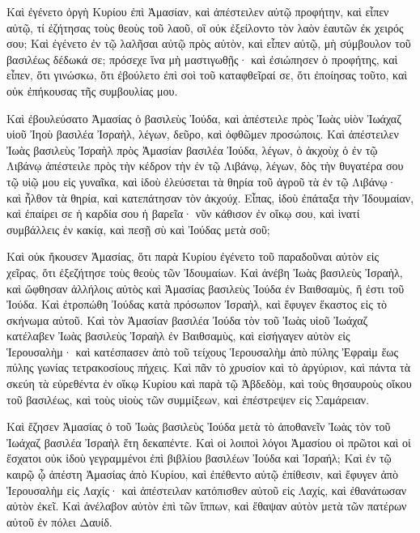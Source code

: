 {Καὶ ἐγένετο ὀργὴ Κυρίου ἐπὶ Ἀμασίαν, καὶ ἀπέστειλεν αὐτῷ προφήτην, καὶ εἶπεν αὐτῷ, τί ἐζήτησας τοὺς θεοὺς τοῦ λαοῦ, οἳ οὐκ ἐξείλοντο τὸν λαὸν ἑαυτῶν ἐκ χειρός σου;
Καὶ ἐγένετο ἐν τῷ λαλῆσαι αὐτῷ πρὸς αὐτὸν, καὶ εἶπεν αὐτῷ, μὴ σύμβουλον τοῦ βασιλέως δέδωκά σε; πρόσεχε ἵνα μὴ μαστιγωθῇς· καὶ ἐσιώπησεν ὁ προφήτης, καὶ εἶπεν, ὅτι γινώσκω, ὅτι ἐβούλετο ἐπὶ σοὶ τοῦ καταφθεῖραί σε, ὅτι ἐποίησας τοῦτο, καὶ οὐκ ἐπήκουσας τῆς συμβουλίας μου.
\par }{\PP {}Καὶ ἐβουλεύσατο Ἀμασίας ὁ βασιλεὺς Ἰούδα, καὶ ἀπέστειλε πρὸς Ἰωὰς υἱὸν Ἰωάχαζ υἱοῦ Ἰηοὺ βασιλέα Ἰσραὴλ, λέγων, δεῦρο, καὶ ὀφθῶμεν προσώποις.
Καὶ ἀπέστειλεν Ἰωὰς βασιλεὺς Ἰσραὴλ πρὸς Ἀμασίαν βασιλέα Ἰούδα, λέγων, ὁ ἀκχοὺχ ὁ ἐν τῷ Λιβάνῳ ἀπέστειλε πρὸς τὴν κέδρον τὴν ἐν τῷ Λιβάνῳ, λέγων, δὸς τὴν θυγατέρα σου τῷ υἱῷ μου εἰς γυναῖκα, καὶ ἰδοὺ ἐλεύσεται τὰ θηρία τοῦ ἀγροῦ τὰ ἐν τῷ Λιβάνῳ· καὶ ἦλθον τὰ θηρία, καὶ κατεπάτησαν τὸν ἀκχούχ.
Εἶπας, ἰδοὺ ἐπάταξα τὴν Ἰδουμαίαν, καὶ ἐπαίρει σε ἡ καρδία σου ἡ βαρεῖα· νῦν κάθισον ἐν οἴκῳ σου, καὶ ἱνατί συμβάλλεις ἐν κακίᾳ, καὶ πεσῇ σὺ καὶ Ἰούδας μετὰ σοῦ;
\par }{\PP {}Καὶ οὐκ ἤκουσεν Ἀμασίας, ὅτι παρὰ Κυρίου ἐγένετο τοῦ παραδοῦναι αὐτὸν εἰς χεῖρας, ὅτι ἐξεζήτησε τοὺς θεοὺς τῶν Ἰδουμαίων.
Καὶ ἀνέβη Ἰωὰς βασιλεὺς Ἰσραὴλ, καὶ ὤφθησαν ἀλλήλοις αὐτὸς καὶ Ἀμασίας βασιλεὺς Ἰούδα ἐν Βαιθσαμὺς, ἥ ἐστι τοῦ Ἰούδα.
Καὶ ἐτροπώθη Ἰούδας κατὰ πρόσωπον Ἰσραὴλ, καὶ ἔφυγεν ἕκαστος εἰς τὸ σκήνωμα αὐτοῦ.
Καὶ τὸν Ἀμασίαν βασιλέα Ἰούδα τὸν τοῦ Ἰωὰς υἱοῦ Ἰωάχαζ κατέλαβεν Ἰωὰς βασιλεὺς Ἰσραὴλ ἐν Βαιθσαμὺς, καὶ εἰσήγαγεν αὐτὸν εἰς Ἱερουσαλὴμ· καὶ κατέσπασεν ἀπὸ τοῦ τείχους Ἱερουσαλὴμ ἀπὸ πύλης Ἐφραὶμ ἕως πύλης γωνίας τετρακοσίους πήχεις.
Καὶ πᾶν τὸ χρυσίον καὶ τὸ ἀργύριον, καὶ πάντα τὰ σκεύη τὰ εὑρεθέντα ἐν οἴκῳ Κυρίου καὶ παρὰ τῷ Ἀβδεδὸμ, καὶ τοὺς θησαυροὺς οἴκου τοῦ βασιλέως, καὶ τοὺς υἱοὺς τῶν συμμίξεων, καὶ ἐπέστρεψεν εἰς Σαμάρειαν.
\par }{\PP {}Καὶ ἔζησεν Ἀμασίας ὁ τοῦ Ἰωὰς βασιλεὺς Ἰούδα μετὰ τὸ ἀποθανεῖν Ἰωὰς τὸν τοῦ Ἰωάχαζ βασιλέα Ἰσραὴλ ἔτη δεκαπέντε.
Καὶ οἱ λοιποὶ λόγοι Ἀμασίου οἱ πρῶτοι καὶ οἱ ἔσχατοι οὐκ ἰδοὺ γεγραμμένοι ἐπὶ βιβλίου βασιλέων Ἰούδα καὶ Ἰσραήλ;
Καὶ ἐν τῷ καιρῷ ᾧ ἀπέστη Ἀμασίας ἀπὸ Κυρίου, καὶ ἐπέθεντο αὐτῷ ἐπίθεσιν, καὶ ἔφυγεν ἀπὸ Ἱερουσαλὴμ εἰς Λαχίς· καὶ ἀπέστειλαν κατόπισθεν αὐτοῦ εἰς Λαχίς, καὶ ἐθανάτωσαν αὐτὸν ἐκεῖ.
Καὶ ἀνέλαβον αὐτὸν ἐπὶ τῶν ἵππων, καὶ ἔθαψαν αὐτὸν μετὰ τῶν πατέρων αὐτοῦ ἐν πόλει Δαυίδ.

}
